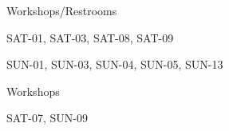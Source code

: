 \documentclass{article}
\newcommand{\room}[1]{
    \noindent
    #1
    \vspace{.2in}

}
\begin{document}
\rssheader[2in]

\vfill

\begin{minipage}{\textwidth}
    \begin{minipage}{.2\textwidth}
        \begin{center}
            \rssarrowup[1in]
        \end{center}
    \end{minipage}
    \begin{minipage}{.7\textwidth}
        \begin{center}
            \rssbig
            \room{Workshops/Restrooms}
            \rsstiny
            \room{SAT-01, SAT-03, SAT-08, SAT-09}
            \room{SUN-01, SUN-03, SUN-04, SUN-05, SUN-13}
        \end{center}
    \end{minipage}
\end{minipage}

\vfill

\begin{center}
    \rssbig
    \room{Workshops}
    \rsstiny
    \room{SAT-07, SUN-09}
\end{center}

\rssarrowright[1in]

\vfill
\end{document}
